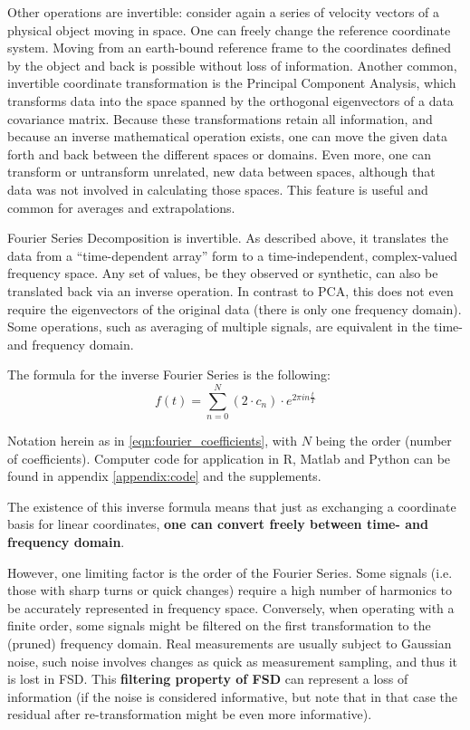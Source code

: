 Other operations are invertible: consider again a series of velocity vectors of a physical object moving in space.
One can freely change the reference coordinate system.
Moving from an earth-bound reference frame to the coordinates defined by the object and back is possible without loss of information.
Another common, invertible coordinate transformation is the Principal Component Analysis, which transforms data into the space spanned by the orthogonal eigenvectors of a data covariance matrix.
Because these transformations retain all information, and because an inverse mathematical operation exists, one can move the given data forth and back between the different spaces or domains.
Even more, one can transform or untransform unrelated, new data between spaces, although that data was not involved in calculating those spaces.
This feature is useful and common for averages and extrapolations.


Fourier Series Decomposition is invertible.
As described above, it translates the data from a ``time-dependent array'' form to a time-independent, complex-valued frequency space.
Any set of values, be they observed or synthetic, can also be translated back via an inverse operation.
In contrast to PCA, this does not even require the eigenvectors of the original data (there is only one frequency domain).
Some operations, such as averaging of multiple signals, are equivalent in the time- and frequency domain.

The formula for the inverse Fourier Series is the following:
\begin{equation}\label{eqn:fourier_inversion}
	f(t) = \sum\limits_{n=0}^{N} (2\cdot c_{n})\cdot e^{2\pi i n \frac{t}{T}}
\end{equation}

Notation herein as in \eqref{eqn:fourier_coefficients}, with \(N\) being the order (number of coefficients).
Computer code for application in R, Matlab and Python can be found in appendix \ref{appendix:code} and the supplements.

The existence of this inverse formula means that just as exchanging a coordinate basis for linear coordinates, \textbf{one can convert freely between time- and frequency domain}.


However, one limiting factor is the order of the Fourier Series.
Some signals (i.e. those with sharp turns or quick changes) require a high number of harmonics to be accurately represented in frequency space.
Conversely, when operating with a finite order, some signals might be filtered on the first transformation to the (pruned) frequency domain.
Real measurements are usually subject to Gaussian noise, such noise involves changes as quick as measurement sampling, and thus it is lost in FSD.
This \textbf{filtering property of FSD} can represent a loss of information (if the noise is considered informative, but note that in that case the residual after re-transformation might be even more informative).


